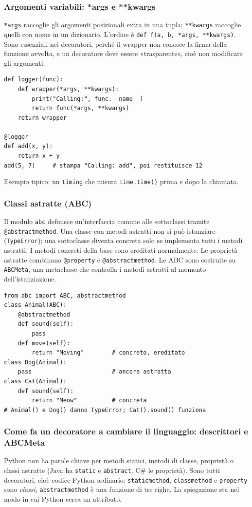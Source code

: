 \documentclass[a4paper,12pt]{article}
\begin{document}
\subsubsection{Argomenti variabili: *args e **kwargs}
\texttt{*args} raccoglie gli argomenti posizionali extra in una tupla; \texttt{**kwargs}
raccoglie quelli con nome in un dizionario. L'ordine è \texttt{def f(a, b, *args, **kwargs)}.
Sono essenziali nei decoratori, perché il wrapper non conosce la firma della funzione
avvolta, e un decoratore deve essere «trasparente», cioè non modificare gli argomenti:
\begin{verbatim}
def logger(func):
    def wrapper(*args, **kwargs):
        print("Calling:", func.__name__)
        return func(*args, **kwargs)
    return wrapper

@logger
def add(x, y):
    return x + y
add(5, 7)     # stampa "Calling: add", poi restituisce 12
\end{verbatim}
Esempio tipico: un \texttt{timing} che misura \texttt{time.time()} prima e dopo la chiamata.

\subsubsection{Classi astratte (ABC)}
Il modulo \texttt{abc} definisce un'interfaccia comune alle sottoclassi tramite
\texttt{@abstractmethod}. Una classe con metodi astratti non si può istanziare (\texttt{TypeError});
una sottoclasse diventa concreta solo se implementa tutti i metodi astratti. I metodi
concreti della base sono ereditati normalmente. Le proprietà astratte combinano
\texttt{@property} e \texttt{@abstractmethod}. Le ABC sono costruite su \texttt{ABCMeta}, una
metaclasse che controlla i metodi astratti al momento dell'istanziazione.
\begin{verbatim}
from abc import ABC, abstractmethod
class Animal(ABC):
    @abstractmethod
    def sound(self):
        pass
    def move(self):
        return "Moving"        # concreto, ereditato
class Dog(Animal):
    pass                       # ancora astratta
class Cat(Animal):
    def sound(self):
        return "Meow"          # concreta
# Animal() e Dog() danno TypeError; Cat().sound() funziona
\end{verbatim}

\subsubsection{Come fa un decoratore a cambiare il linguaggio: descrittori e ABCMeta}
Python non ha parole chiave per metodi statici, metodi di classe, proprietà o classi astratte
(Java ha \texttt{static} e \texttt{abstract}, C\# le proprietà). Sono tutti decoratori, cioè
codice Python ordinario: \texttt{staticmethod}, \texttt{classmethod} e \texttt{property} sono
\emph{classi}, \texttt{abstractmethod} è una funzione di tre righe. La spiegazione sta nel modo
in cui Python cerca un attributo.
\end{document}
